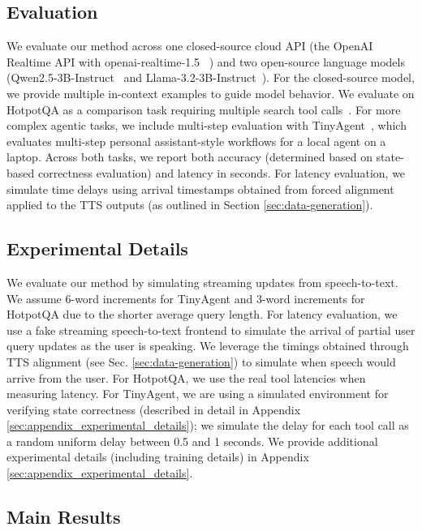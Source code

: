 \subsection{Evaluation}

We evaluate our method across one closed-source cloud API (the OpenAI Realtime API with openai-realtime-1.5 ~\citep{openai_realtime_api}) and two open-source language models (Qwen2.5-3B-Instruct~\citep{qwen2.5} and Llama-3.2-3B-Instruct~\citep{grattafiori2024llama}). 
For the closed-source model, we provide multiple in-context examples to guide model behavior.
We evaluate on HotpotQA as a comparison task requiring multiple search tool calls~\citep{yang2018hotpotqa}.
For more complex agentic tasks, we include multi-step evaluation with TinyAgent~\citep{erdogan2024tinyagentfunctioncallingedge}, which evaluates multi-step personal assistant-style workflows for a local agent on a laptop. 
Across both tasks, we report both accuracy (determined based on state-based correctness evaluation) and latency in seconds.
For latency evaluation, we simulate time delays using arrival timestamps obtained from forced alignment applied to the TTS outputs (as outlined in Section \ref{sec:data-generation}).

\subsection{Experimental Details}
\label{sec:experimental-details}

We evaluate our method by simulating streaming updates from speech-to-text.
We assume 6-word increments for TinyAgent and 3-word increments for HotpotQA due to the shorter average query length.
For latency evaluation, we use a fake streaming speech-to-text frontend to simulate the arrival of partial user query updates as the user is speaking.
We leverage the timings obtained through TTS alignment (see Sec. \ref{sec:data-generation}) to simulate when speech would arrive from the user.
For HotpotQA, we use the real tool latencies when measuring latency.
For TinyAgent, we are using a simulated environment for verifying state correctness (described in detail in Appendix \ref{sec:appendix_experimental_details}); we simulate the delay for each tool call as a random uniform delay between 0.5 and 1 seconds.
We provide additional experimental details (including training details) in Appendix \ref{sec:appendix_experimental_details}.

\subsection{Main Results}

